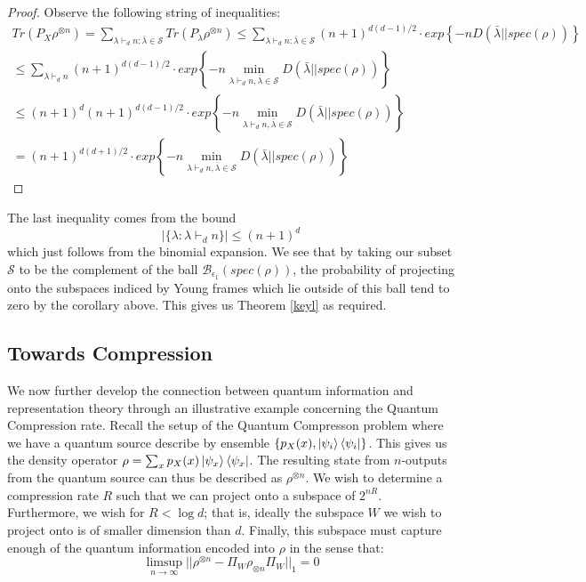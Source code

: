 \documentclass[12pt]{article}%
\begin{document}
\begin{proof}
Observe the following string of inequalities:
  \begin{gather*}
      Tr(P_X\rho^{\otimes n}) = \sum_{\lambda \vdash_d n: \bar{\lambda} \in \mathcal{S}} Tr(P_\lambda\rho^{\otimes n}) \leq \sum_{\lambda \vdash_d n: \bar{\lambda} \in \mathcal{S}} (n+1)^{d(d-1)/2} \cdot exp \left\{ -n D(\bar{\lambda}||spec(\rho)) \right\} \\
      \leq
            \sum_{\lambda \vdash_d n} (n+1)^{d(d-1)/2} \cdot exp \left\{ -n \min_{\lambda \vdash_d n, \bar{\lambda} \in \mathcal{S}} D(\bar{\lambda}||spec(\rho)) \right\} \\
      \leq (n+1)^d  (n+1)^{d(d-1)/2} \cdot exp \left\{ -n \min_{\lambda \vdash_d n, \bar{\lambda} \in \mathcal{S}} D(\bar{\lambda}||spec(\rho)) \right\} \\
      = (n+1)^{d(d+1)/2} \cdot exp\left\{-n \min_{\lambda \vdash_d n, \bar{\lambda} \in \mathcal{S}}{D(\bar{\lambda}||spec(\rho))} \right\}
  \end{gather*}
\end{proof}
\noindent The last inequality comes from the bound
\begin{equation}\label{framebound}
|\{\lambda: \lambda \vdash_d n \}| \leq (n+1)^d
\end{equation}
which just follows from the binomial expansion.
\noindent We see that by taking our subset $\mathcal{S}$ to be the complement of the ball $\mathcal{B}_{\epsilon_1}(spec(\rho))$, the probability of projecting onto the subspaces indiced by Young frames which lie outside of this ball tend to zero by the corollary above. This gives us Theorem \ref{keyl} as required.

\subsection{Towards Compression}
We now further develop the connection between quantum information and representation theory through an illustrative example concerning the Quantum Compression rate. Recall the setup of the Quantum Compresson problem where we have a quantum source describe by ensemble $\{p_X(x), \ket{\psi_i}\bra{\psi_i}\}$. This gives us the density operator $\rho = \sum_x p_X(x)\ket{\psi_x}\bra{\psi_x}$. The resulting state from $n$-outputs from the quantum source can thus be described as $\rho^{\otimes n}$. We wish to determine a compression rate $R$ such that we can project onto a subspace of $2^{nR}$. Furthermore, we wish for $R < \log{d}$; that is, ideally the subspace $W$ we wish to project onto is of smaller dimension than $d$. Finally, this subspace must capture enough of the quantum information encoded into $\rho$ in the sense that:
\begin{equation*}
  \limsup_{n \rightarrow \infty} || \rho^{\otimes n} - \Pi_{W}\rho_{\otimes n}\Pi_W ||_1 = 0
\end{equation*}
\end{document}
